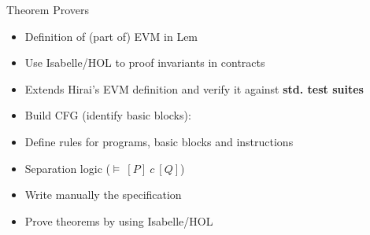 \begin{frame}{Theorem Provers}
\begin{block}{\cite{hirai2017defining}}
\begin{itemize}
\item Definition of (part of) EVM in Lem
\item Use Isabelle/HOL to proof invariants in 
contracts
\end{itemize}
\end{block}
\begin{block}{\cite{towardsVerifyingEthereumSmartContract}}
\begin{itemize}
\item Extends Hirai's EVM definition and verify it against \textbf{std. test suites}
\item Build CFG (identify basic blocks):
\item Define rules for programs, basic blocks and instructions  
\item Separation logic ($\vDash\ [P]\ c\ [Q]$)
\item Write manually the specification
\item Prove theorems by using Isabelle/HOL
\end{itemize}
\end{block}

\end{frame}